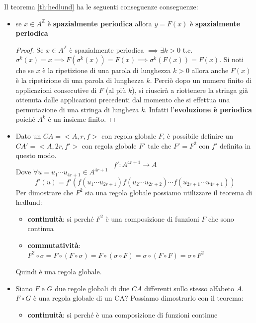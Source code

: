 Il teorema \ref{th:hedlund} ha le seguenti conseguenze conseguenze:
\begin{itemize}
    \item se $x\in A^\mathbb{Z}$ è \textbf{spazialmente periodica} allora $y=F(x)$
          è  \textbf{spazialmente periodica}
          \begin{proof}
              Se $x\in A^\mathbb{Z}$  è spazialmente periodica $\implies\exists k>0$ t.c.
              $\sigma^k(x)=x \implies F(\sigma^k(x)) = F(x)\implies \sigma^k(F(x))=F(x)$.
              Si noti che se $x$ è la ripetizione di una parola di lunghezza $k>0$ allora
              anche $F(x)$ è la ripetizione di una parola di lunghezza $k$. Perciò dopo
              un numero finito di applicazioni consecutive di $F$ (al più $k$), si riuscirà
              a riottenere la stringa già ottenuta dalle applicazioni precedenti dal momento
              che si effettua una permutazione di una stringa di lungheza $k$. Infatti l'\textbf{evoluzione
                è  periodica} poiché $A^k$ è un insieme finito.
          \end{proof}
    \item Dato un $CA = <A,r,f>$ con regola globale $F$, è possibile definire un  $CA '= <A,2r,f'>$
          con regola globale $F'$ tale che $F'=F^2$ con $f'$ definita in questo modo.
          $$f':A^{4r+1}\rightarrow A$$
          Dove $\forall u=u_1\cdots u_{4r+1}\in A^{4r+1}$
          $$f'(u) = f'(f(u_1\cdots u_{2r+1})f(u_{2}\cdots u_{2r+2})\cdots f(u_{2r+1}\cdots u_{4r+1}))$$
          Per dimostrare che $F^2$ sia una regola globale possiamo utilizzare il teorema di
          hedlund:
          \begin{itemize}
              \item \textbf{continuità}: si perché $F^2$ è una composizione di funzioni $F$ 
              che sono continua
              \item \textbf{commutatività}: $F^2\circ \sigma = F\circ (F\circ \sigma ) = F\circ (\sigma\circ F  ) = \sigma\circ (F\circ F  )  = \sigma \circ F^2$
          \end{itemize}
          Quindi è una regola globale.
    \item Siano $F$ e $G$ due regole globali di due $CA$ differenti sullo stesso
          alfabeto $A$. $F\circ G$ è una regola globale di un CA? Possiamo dimostrarlo con
          il teorema:
          \begin{itemize}
              \item \textbf{continuità}: si perché è una composizione di funzioni continue

\end{itemize}
\end{itemize}
